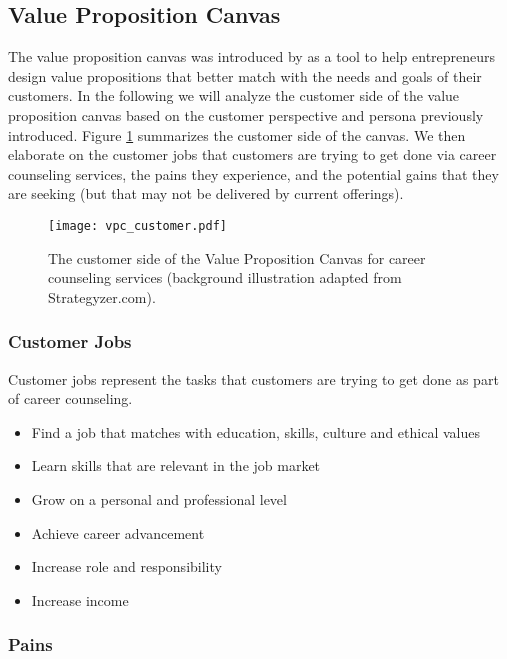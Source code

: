 \subsection{Value Proposition Canvas}

The value proposition canvas was introduced by \cite{osterwalderValuePropositionDesign2014} as a
tool to help entrepreneurs design value propositions that better match with the needs and goals of their customers.
In the following we will analyze the customer side of the value proposition canvas based on the customer perspective
and persona previously introduced. Figure \ref{fig:vpc_customer} summarizes the customer side of the canvas. We then
elaborate on the customer jobs that customers are trying to get done via career counseling services, the pains they
experience, and the potential gains that they are seeking (but that may not be delivered by current offerings).

\begin{figure}[h!]
    \centering
    \caption{The customer side of the Value Proposition Canvas for career counseling services (background illustration adapted from Strategyzer.com).}
    \label{fig:vpc_customer}
    \texttt{[image: vpc\_customer.pdf]}
\end{figure}

\subsubsection{Customer Jobs}

Customer jobs represent the tasks that customers are trying to get done as part of career counseling.

\begin{itemize}
    \item Find a job that matches with education, skills, culture and ethical values
    \item Learn skills that are relevant in the job market
    \item Grow on a personal and professional level
    \item Achieve career advancement
    \item Increase role and responsibility
    \item Increase income
\end{itemize}

\subsubsection{Pains}

